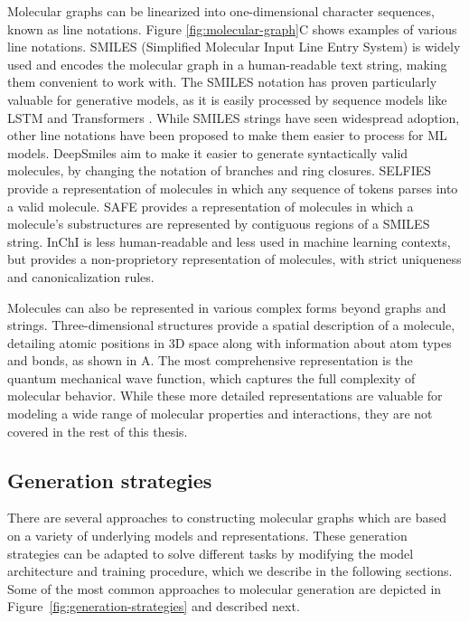 Molecular graphs can be linearized into one-dimensional character sequences, known as line
notations. Figure \ref{fig:molecular-graph}C shows examples of various line notations. SMILES
(Simplified Molecular Input Line Entry System) \citep{weiningerSMILESChemicalLanguage1988} is
widely used and encodes the molecular graph in a human-readable text string, making them
convenient to work with. The SMILES notation has proven particularly valuable for
generative models, as it is easily processed by sequence models like \ac{LSTM}
\citep{hochreiterLongShorttermMemory1997} and Transformers \citep{vaswaniAttentionAllYou2017}. While
SMILES strings have seen widespread adoption, other line notations have been proposed to make them
easier to process for \ac{ML} models. DeepSmiles
\citep{oboyleDeepSMILESAdaptationSMILES2018} aim to make it easier to generate syntactically valid
molecules, by changing the notation of branches and ring closures. SELFIES
\citep{krennSelfreferencingEmbeddedStrings2020a} provide a representation of molecules in which any sequence
of tokens parses into a valid molecule. SAFE \citep{noutahiGottaBeSAFE2024} provides a
representation of molecules in which a molecule's substructures are represented by contiguous
regions of a SMILES string. InChI \citep{hellerInChIIUPACInternational2015} is less human-readable
and less used in machine learning contexts, but provides a non-proprietory representation of
molecules, with strict uniqueness and canonicalization rules.

Molecules can also be represented in various complex forms beyond graphs and strings.
Three-dimensional structures provide a spatial description of a molecule, detailing atomic positions
in 3D space along with information about atom types and bonds, as shown in
A. The most comprehensive representation is the quantum mechanical
wave function, which captures the full complexity of molecular behavior. While these more
detailed representations are valuable for modeling a wide range of molecular properties and
interactions, they are not covered in the rest of this thesis.

\subsection{Generation strategies}
There are several approaches to constructing molecular graphs which are based on a variety of
underlying models and representations. These generation strategies can be adapted to solve different
tasks by modifying the model architecture and training procedure, which we describe in the following
sections. Some of the most common approaches to molecular generation are depicted in
Figure~\ref{fig:generation-strategies} and described next.

